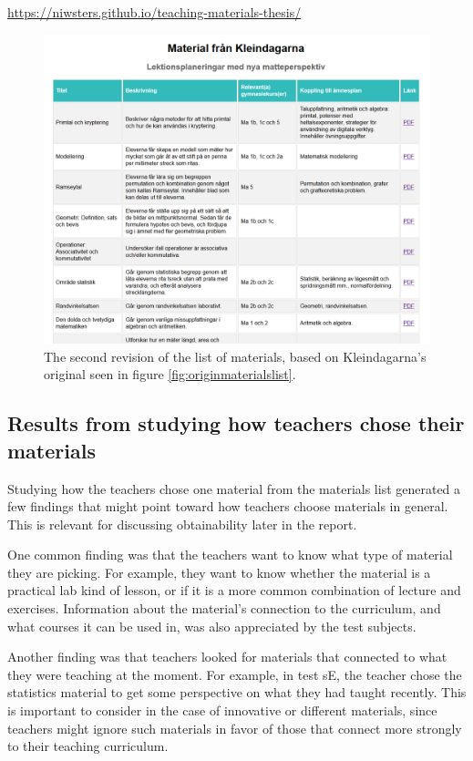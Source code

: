 \url{https://niwsters.github.io/teaching-materials-thesis/}

\begin{figure}[H]
\centering
\includegraphics[width=\linewidth]{figure/screenshot_materiallista_revision_2.png}
  \caption{The second revision of the list of materials, based on Kleindagarna's original seen in figure \ref{fig:originmaterialslist}.}
  \label{fig:revmaterialslist}
\end{figure}

\subsection{Results from studying how teachers chose their materials} \label{pickmaterials}

Studying how the teachers chose one material from the materials list generated a few findings that might point toward how teachers choose materials in general. This is relevant for discussing obtainability later in the report.

One common finding was that the teachers want to know what type of material they are picking. For example, they want to know whether the material is a practical lab kind of lesson, or if it is a more common combination of lecture and exercises. Information about the material's connection to the curriculum, and what courses it can be used in, was also appreciated by the test subjects.

Another finding was that teachers looked for materials that connected to what they were teaching at the moment. For example, in test sE, the teacher chose the statistics material to get some perspective on what they had taught recently. This is important to consider in the case of innovative or different materials, since teachers might ignore such materials in favor of those that connect more strongly to their teaching curriculum.

